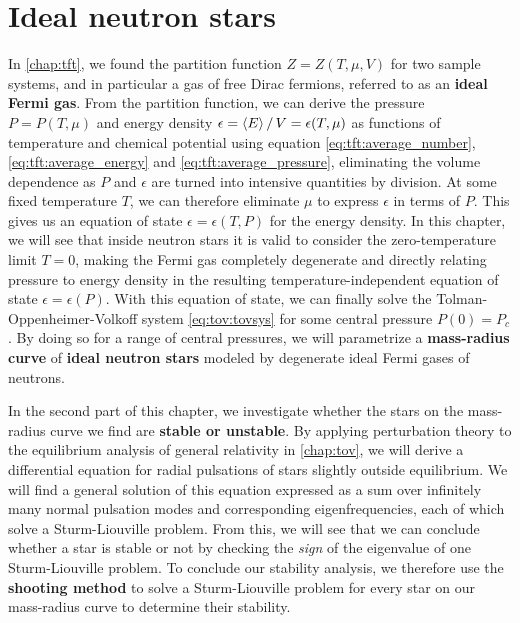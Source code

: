 \chapter{Ideal neutron stars}
\label{chap:nstars}

In \cref{chap:tft}, we found the partition function $Z = Z(T, \mu, V)$ for two sample systems, and in particular a gas of free Dirac fermions, referred to as an \textbf{ideal Fermi gas}.
From the partition function, we can derive the pressure $P = P(T, \mu)$ and energy density $\epsilon = \left< E \right> / \, V = \epsilon(T, \mu)$ as functions of temperature and chemical potential using equation \eqref{eq:tft:average_number}, \eqref{eq:tft:average_energy} and \eqref{eq:tft:average_pressure}, eliminating the volume dependence as $P$ and $\epsilon$ are turned into intensive quantities by division.
At some fixed temperature $T$, we can therefore eliminate $\mu$ to express $\epsilon$ in terms of $P$.
This gives us an equation of state $\epsilon = \epsilon(T, P)$ for the energy density.
In this chapter, we will see that inside neutron stars it is valid to consider the zero-temperature limit $T=0$, making the Fermi gas completely degenerate and directly relating pressure to energy density in the resulting temperature-independent equation of state $\epsilon = \epsilon(P)$.
With this equation of state, we can finally solve the Tolman-Oppenheimer-Volkoff system \eqref{eq:tov:tovsys} for some central pressure $P(0)=P_c$.
By doing so for a range of central pressures, we will parametrize a \textbf{mass-radius curve} of \textbf{ideal neutron stars} modeled by degenerate ideal Fermi gases of neutrons.

In the second part of this chapter, we investigate whether the stars on the mass-radius curve we find are \textbf{stable or unstable}.
By applying perturbation theory to the equilibrium analysis of general relativity in \cref{chap:tov}, we will derive a differential equation for radial pulsations of stars slightly outside equilibrium.
We will find a general solution of this equation expressed as a sum over infinitely many normal pulsation modes and corresponding eigenfrequencies, each of which solve a Sturm-Liouville problem.
From this, we will see that we can conclude whether a star is stable or not by checking the \emph{sign} of the eigenvalue of one Sturm-Liouville problem.
To conclude our stability analysis, we therefore use the \textbf{shooting method} to solve a Sturm-Liouville problem for every star on our mass-radius curve to determine their stability.

